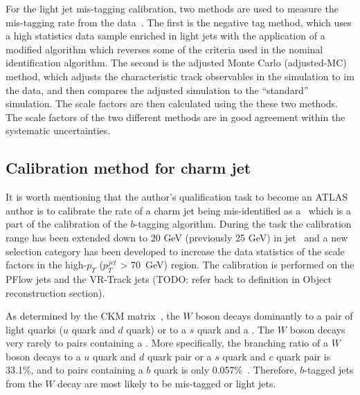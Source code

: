 \documentclass[letterpaper,12pt]{article}
\begin{document}
For the light jet mis-tagging calibration, two methods are 
used to measure the mis-tagging rate from the data~\cite{ATLAS-CONF-2018-006}. 
The first is the negative tag method, which uses a high statistics data sample enriched 
in light jets with the application of a modified algorithm which 
reverses some of the criteria used in the nominal identification 
algorithm.
The second is the adjusted Monte Carlo (adjusted-MC) method, which 
adjusts the characteristic track observables in the simulation 
to im the data, and then compares the adjusted simulation to the 
``standard'' simulation. The scale factors are then calculated using 
the these two methods. The scale factors of the two different methods 
are in good agreement within the systematic uncertainties. 



\subsection{Calibration method for charm jet}
\label{sec:Calibration method for charm jet}

It is worth mentioning that the author's qualification task to become an ATLAS author is to 
calibrate the rate of a charm jet being mis-identified as a \bjet\, which is a part 
of the calibration of the $b$-tagging algorithm.
During the task the calibration range has been extended down to 20 GeV (previously 25 GeV) in
jet \pt\ and a new selection category has been developed 
to increase the data statistics of the scale factors in the 
high-$p_T$ ($p_T^{jet}$ > 70~GeV) region.
The calibration is performed on the PFlow jets and the VR-Track jets (TODO: refer back to definition in Object reconstruction section). 

As determined by the CKM matrix~\cite{CKM1,CKM2}, the $W$ boson decays dominantly to 
a pair of light quarks ($u$ quark and $d$ quark) or to
a $s$ quark and a \cquark. The $W$ boson decays very rarely to pairs containing a \bquark. 
More specifically, the branching ratio of a $W$ boson decays to a $u$ quark and $d$ quark pair or 
a $s$ quark and $c$ quark pair is 33.1\%, and to pairs containing a $b$ quark is only 0.057\%~\cite{PDG}. 
Therefore, $b$-tagged jets from the $W$ decay are most likely 
to be mis-tagged \cjets or light jets. 
\end{document}
